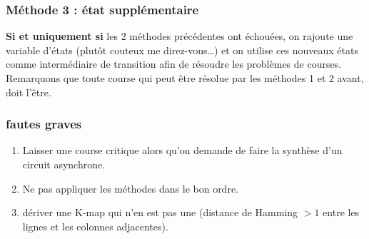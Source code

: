 \subsubsection{Méthode 3 : état supplémentaire}
\textbf{Si et uniquement si} les 2 méthodes précédentes ont échouées, on rajoute une variable d'états (plutôt couteux me direz-vous\dots) et on utilise ces nouveaux états comme intermédiaire de transition afin de résoudre les problèmes de courses.\\
Remarquons que toute course qui peut être résolue par les méthodes 1 et 2 avant, doit l'être.
\subsubsection{fautes graves}
\begin{enumerate}
	\item Laisser une course critique alors qu'on demande de faire la synthèse d'un circuit asynchrone.
	\item Ne pas appliquer les méthodes dans le bon ordre.
	\item dériver une K-map qui n'en est pas une (distance de Hamming $>1$ entre les lignes et les colonnes adjacentes).
\end{enumerate}